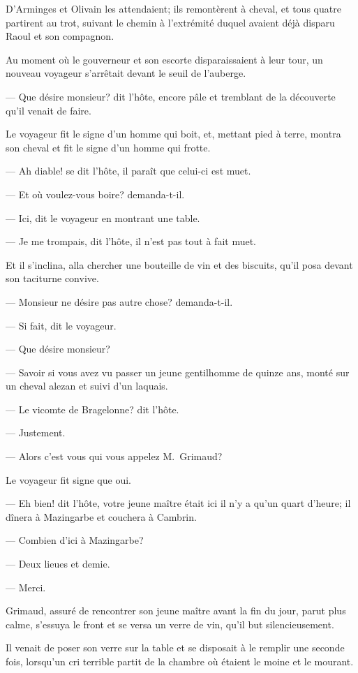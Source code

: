 D'Arminges et Olivain les attendaient; ils remontèrent à cheval, et tous quatre partirent au trot, suivant le chemin à l'extrémité duquel avaient déjà disparu Raoul et son compagnon.

Au moment où le gouverneur et son escorte disparaissaient à leur tour, un nouveau voyageur s'arrêtait devant le seuil de l'auberge.

— Que désire monsieur? dit l'hôte, encore pâle et tremblant de la découverte qu'il venait de faire.

Le voyageur fit le signe d'un homme qui boit, et, mettant pied à terre, montra son cheval et fit le signe d'un homme qui frotte.

— Ah diable! se dit l'hôte, il paraît que celui-ci est muet.

— Et où voulez-vous boire? demanda-t-il.

— Ici, dit le voyageur en montrant une table.

— Je me trompais, dit l'hôte, il n'est pas tout à fait muet.

Et il s'inclina, alla chercher une bouteille de vin et des biscuits, qu'il posa devant son taciturne convive.

— Monsieur ne désire pas autre chose? demanda-t-il.

— Si fait, dit le voyageur.

— Que désire monsieur?

— Savoir si vous avez vu passer un jeune gentilhomme de quinze ans, monté sur un cheval alezan et suivi d'un laquais.

— Le vicomte de Bragelonne? dit l'hôte.

— Justement.

— Alors c'est vous qui vous appelez M.~Grimaud?

Le voyageur fit signe que oui.

— Eh bien! dit l'hôte, votre jeune maître était ici il n'y a qu'un quart d'heure; il dînera à Mazingarbe et couchera à Cambrin.

— Combien d'ici à Mazingarbe?

— Deux lieues et demie.

— Merci.

Grimaud, assuré de rencontrer son jeune maître avant la fin du jour, parut plus calme, s'essuya le front et se versa un verre de vin, qu'il but silencieusement.

Il venait de poser son verre sur la table et se disposait à le remplir une seconde fois, lorsqu'un cri terrible partit de la chambre où étaient le moine et le mourant.

